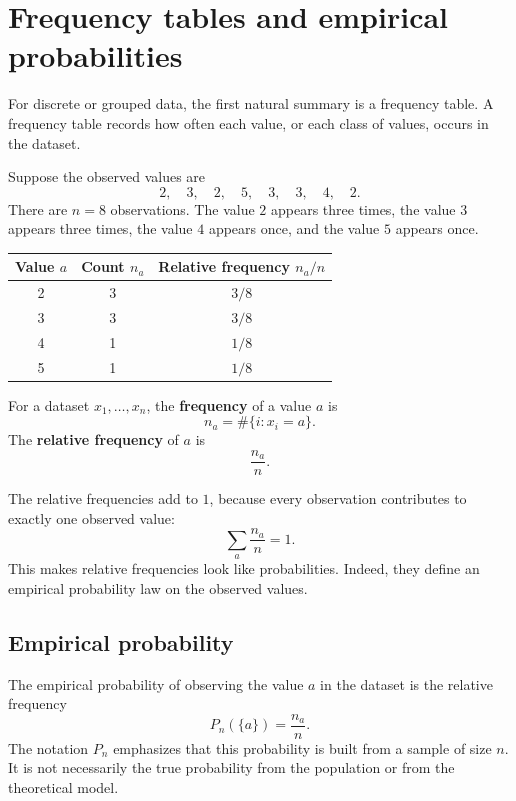 \section{Frequency tables and empirical probabilities}

For discrete or grouped data, the first natural summary is a frequency table. A
frequency table records how often each value, or each class of values, occurs in
the dataset.

Suppose the observed values are
\[
2,\quad 3,\quad 2,\quad 5,\quad 3,\quad 3,\quad 4,\quad 2.
\]
There are \(n=8\) observations. The value \(2\) appears three times, the value
\(3\) appears three times, the value \(4\) appears once, and the value \(5\)
appears once.

\begin{center}
\begin{tabular}{ccc}
\toprule
Value \(a\) & Count \(n_a\) & Relative frequency \(n_a/n\) \\
\midrule
2 & 3 & \(3/8\) \\
3 & 3 & \(3/8\) \\
4 & 1 & \(1/8\) \\
5 & 1 & \(1/8\) \\
\bottomrule
\end{tabular}
\end{center}

\begin{definitionbox}
For a dataset \(x_1,\ldots,x_n\), the \textbf{frequency} of a value \(a\) is
\[
n_a=\#\{i:x_i=a\}.
\]
The \textbf{relative frequency} of \(a\) is
\[
\frac{n_a}{n}.
\]
\end{definitionbox}

The relative frequencies add to \(1\), because every observation contributes to
exactly one observed value:
\[
\sum_a \frac{n_a}{n}=1.
\]
This makes relative frequencies look like probabilities. Indeed, they define an
empirical probability law on the observed values.

\subsection*{Empirical probability}

The empirical probability of observing the value \(a\) in the dataset is the
relative frequency
\[
P_n(\{a\})=\frac{n_a}{n}.
\]
The notation \(P_n\) emphasizes that this probability is built from a sample of
size \(n\). It is not necessarily the true probability from the population or
from the theoretical model.

